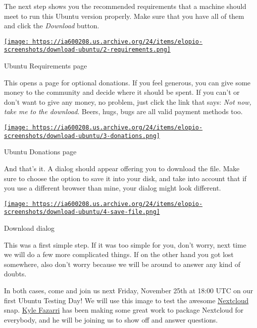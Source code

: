 \documentclass[12pt]{article}
\begin{document}
The next step shows you the recommended requirements that a machine should
meet to run this Ubuntu version properly. Make sure that you have all of them
and click the \emph{Download} button.

\begin{center}
  \href{
    https://ia600208.us.archive.org/24/items/elopio-screenshots/download-ubuntu/2-requirements.png}{
    \texttt{[image: 
    https://ia600208.us.archive.org/24/items/elopio-screenshots/download-ubuntu/2-requirements.png]}
  }
  \caption{Ubuntu Requirements page}
\end{center}

This opens a page for optional donations. If you feel generous, you can give
some money to the community and decide where it should be spent. If you can't
or don't want to give any money, no problem, just click the link that says:
\emph{Not now, take me to the download}. Beers, hugs, bugs are all valid
payment methods too.

\begin{center}
  \href{
    https://ia600208.us.archive.org/24/items/elopio-screenshots/download-ubuntu/3-donations.png}{
    \texttt{[image: 
    https://ia600208.us.archive.org/24/items/elopio-screenshots/download-ubuntu/3-donations.png]}
  }
  \caption{Ubuntu Donations page}
\end{center}

And that's it. A dialog should appear offering you to download the file. Make
sure to choose the option to save it into your disk, and take into account
that if you use a different browser than mine, your dialog might look
different.

\begin{center}
  \href{
    https://ia600208.us.archive.org/24/items/elopio-screenshots/download-ubuntu/4-save-file.png}{
    \texttt{[image: 
    https://ia600208.us.archive.org/24/items/elopio-screenshots/download-ubuntu/4-save-file.png]}
  }
  \caption{Download dialog}
\end{center}

This was a first simple step. If it was too simple for you, don't worry, next
time we will do a few more complicated things. If on the other hand you got
lost somewhere, also don't worry because we will be around to answer any kind
of doubts.

In both cases, come and join us next Friday, November 25th at 18:00 UTC on our
first Ubuntu Testing Day! We will use this image to test the awesome
\href{https://nextcloud.com/}{Nextcloud} snap.
\href{https://kyrofa.com/}{Kyle Fazarri} has been making some great work to
package Nextcloud for everybody, and he will be joining us to show off and
answer questions.
\end{document}
